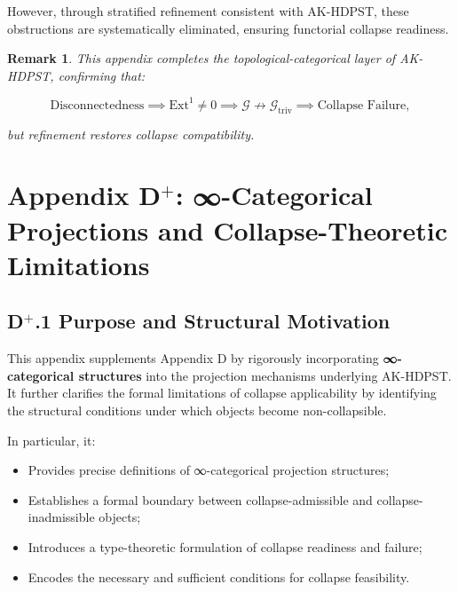 \documentclass[11pt]{article}
\newtheorem{remark}[theorem]{Remark}
\begin{document}
However, through stratified refinement consistent with AK-HDPST, these obstructions are systematically eliminated, ensuring functorial collapse readiness.

\begin{remark}
This appendix completes the topological-categorical layer of AK-HDPST, confirming that:

\[
\text{Disconnectedness} \implies \mathrm{Ext}^1 \neq 0 \implies \mathcal{G} \not\rightarrow \mathcal{G}_{\mathrm{triv}} \implies \text{Collapse Failure},
\]

but refinement restores collapse compatibility.

\end{remark}




\section*{Appendix D$^{+}$: ∞-Categorical Projections and Collapse-Theoretic Limitations}

\subsection*{D$^{+}$.1 Purpose and Structural Motivation}

This appendix supplements Appendix D by rigorously incorporating \textbf{∞-categorical structures} into the projection mechanisms underlying AK-HDPST. It further clarifies the formal limitations of collapse applicability by identifying the structural conditions under which objects become non-collapsible.

In particular, it:

\begin{itemize}
    \item Provides precise definitions of ∞-categorical projection structures;
    \item Establishes a formal boundary between collapse-admissible and collapse-inadmissible objects;
    \item Introduces a type-theoretic formulation of collapse readiness and failure;
    \item Encodes the necessary and sufficient conditions for collapse feasibility.
\end{itemize}
\end{document}
